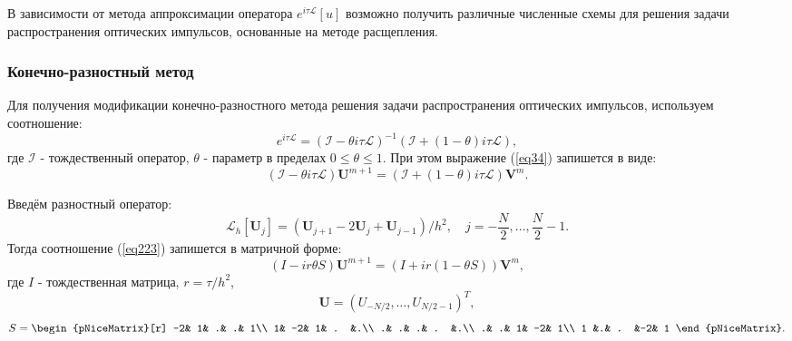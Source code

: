 \documentclass[14pt,a4paper]{extreport}
\begin{document}
			В зависимости от метода аппроксимации оператора \(e^{i\tau\mathscr{L}}[u]\) возможно получить различные численные схемы для решения задачи распространения оптических импульсов, основанные на методе расщепления. 
			
			\subsubsection{Конечно-разностный метод}\label{ch221}
				Для получения модификации конечно-разностного метода решения задачи распространения оптических импульсов, используем соотношение:
				\begin{equation}
					e^{i\tau\mathscr{L}}=\left(\mathscr{I}-\theta i\tau\mathscr{L}\right)^{-1}\left(\mathscr{I}+(1-\theta) i\tau\mathscr{L}\right),
				\end{equation}
				где \(\mathscr{I}\) - тождественный оператор, \(\theta\) - параметр в пределах \( 0\le\theta\le1\). При этом выражение (\ref{eq34}) запишется в виде:
				\begin{equation}\label{eq223}
					\left(\mathscr{I}-\theta i\tau\mathscr{L}\right)\boldsymbol{U}^{m+1}=\left(\mathscr{I}+(1-\theta) i\tau\mathscr{L}\right)\boldsymbol{V}^m.
				\end{equation}
				
				Введём разностный оператор:
				\begin{equation}
					\mathscr{L}_{h}\left[\boldsymbol{U}_{j}\right]=\left(\boldsymbol{U}_{j+1}-2\boldsymbol{U}_{j}+\boldsymbol{U}_{j-1}\right)/h^2, \quad j= -\frac{N}{2}, \ldots , \frac{N}{2}-1.
				\end{equation}
				Тогда соотношение (\ref{eq223}) запишется в матричной форме:
				\begin{equation} \label{eq224}
					\left(I-ir\theta S\right)\boldsymbol{U}^{m+1}=\left(I+ir(1-\theta S)\right)\boldsymbol{V}^m,
				\end{equation}
				где \(I\) - тождественная матрица, \( r=\tau/h^2\),
				\begin{equation} 
					\boldsymbol{U}=\left(U_{-N/2},\ldots ,U_{N/2-1}\right)^T,
				\end{equation}
				\begin{equation} 
					S=
					\begin{pNiceMatrix}[r]
					-2& 1& .& .& 1\\
					1& -2& 1& . &.\\
					.& .& .& . &.\\
					.& .& 1& -2& 1\\
					1 &.& . &-2& 1
					\end{pNiceMatrix}.
				\end{equation}
\end{document}

